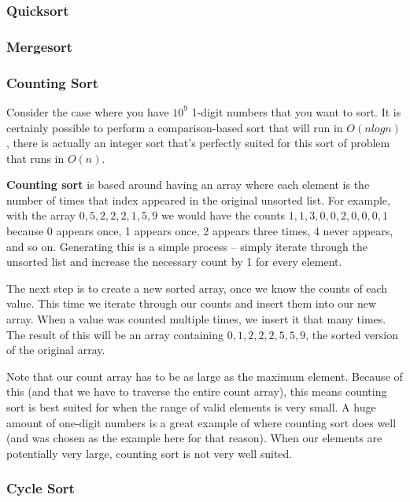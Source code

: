 \subsubsection{Quicksort}

\subsubsection{Mergesort}

\subsubsection{Counting Sort}

Consider the case where you have $10^9$ 1-digit numbers that you want to sort. It is certainly possible to perform a comparison-based sort that will run in $O(n log n)$, there is actually an integer sort that's perfectly suited for this sort of problem that runs in $O(n)$.

\textbf{Counting sort} is based around having an array where each element is the number of times that index appeared in the original unsorted list. For example, with the array $0,5,2,2,2,1,5,9$ we would have the counts $1,1,3,0,0,2,0,0,0,1$ because 0 appears once, 1 appears once, 2 appears three times, 4 never appears, and so on. Generating this is a simple process -- simply iterate through the unsorted list and increase the necessary count by 1 for every element.

The next step is to create a new sorted array, once we know the counts of each value. This time we iterate through our counts and insert them into our new array. When a value was counted multiple times, we insert it that many times. The result of this will be an array containing $0,1,2,2,2,5,5,9$, the sorted version of the original array.


Note that our count array has to be as large as the maximum element. Because of this (and that we have to traverse the entire count array), this means counting sort is best suited for when the range of valid elements is very small. A huge amount of one-digit numbers is a great example of where counting sort does well (and was chosen as the example here for that reason). When our elements are potentially very large, counting sort is not very well suited.

\subsubsection{Cycle Sort}

